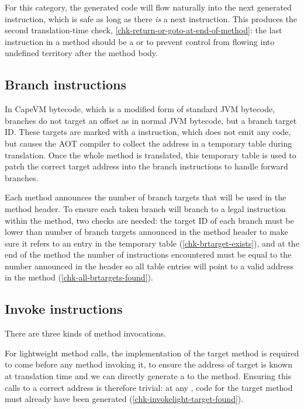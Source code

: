 For this category, the generated code will flow naturally into the next generated instruction, which is safe as long as there \emph{is} a next instruction. This produces the second translation-time check, \ref{chk-return-or-goto-at-end-of-method}: the last instruction in a method should be a  or  to prevent control from flowing into undefined territory after the method body.

\subsection{Branch instructions}
In CapeVM bytecode, which is a modified form of standard JVM bytecode, branches do not target an offset as in normal JVM bytecode, but a branch target ID. These targets are marked with a  instruction, which does not emit any code, but causes the AOT compiler to collect the address in a temporary table during translation. Once the whole method is translated, this temporary table is used to patch the correct target address into the branch instructions to handle forward branches.

Each method announces the number of branch targets that will be used in the method header. To ensure each taken branch will branch to a legal instruction within the method, two checks are needed: the target ID of each branch must be lower than number of branch targets announced in the method header to make sure it refers to an entry in the temporary table (\ref{chk-brtarget-exists}), and at the end of the method the number of  instructions encountered must be equal to the number announced in the header so all table entries will point to a valid address in the method (\ref{chk-all-brtargets-found}).

\subsection{Invoke instructions}
There are three kinds of method invocations.

For lightweight method calls, the implementation of the target method is required to come before any method invoking it, to ensure the address of target is known at translation time and we can directly generate a  to the method. Ensuring this calls to a correct address is therefore trivial: at any , code for the target method must already have been generated (\ref{chk-invokelight-target-found}).

